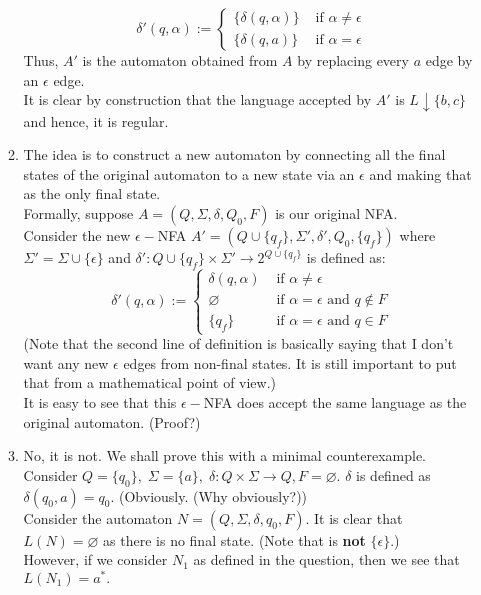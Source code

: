 \documentclass{article}
\let\emptyset\varnothing
\begin{document}
\begin{enumerate}[label = \arabic*.]
\begin{enumerate}[label = (\alph*)]
		\[\delta'(q, \alpha) := \left\{
			\begin{array}{cc}
				\{\delta(q, \alpha)\} & \text{ if }\alpha \neq \epsilon\\
				\{\delta(q, a)\} & \text{ if }\alpha = \epsilon
			\end{array}
		\right.\]
		Thus, $A'$ is the automaton obtained from $A$ by replacing every $a$ edge by an $\epsilon$ edge.\\
		It is clear by construction that the language accepted by $A'$ is $L\downarrow\{b, c\}$ and hence, it is regular.
		\item The idea is to construct a new automaton by connecting all the final states of the original automaton to a new state via an $\epsilon$ and making that as the only final state.\\
		Formally, suppose $A = (Q, \Sigma, \delta, Q_0, F)$ is our original NFA.\\
		Consider the new $\epsilon-$NFA $A' = (Q\cup\{q_f\}, \Sigma', \delta', Q_0, \{q_f\})$ where $\Sigma' = \Sigma\cup\{\epsilon\}$ and $\delta':Q\cup\{q_f\}\times\Sigma' \to 2^{Q\cup\{q_f\}}$ is defined as:
		\[\delta'(q, \alpha) := \left\{
			\begin{array}{cl}
				\delta(q, \alpha) & \text{ if }  \alpha \neq \epsilon\\
				\emptyset & \text{ if } \alpha = \epsilon\text{ and }q \notin F  \\
				\{q_f\} & \text{ if } \alpha = \epsilon \text{ and } q \in F 
			\end{array}		
		\right.\]
		(Note that the second line of definition is basically saying that I don't want any new $\epsilon$ edges from non-final states. It is still important to put that from a mathematical point of view.)\\
		It is easy to see that this $\epsilon-$NFA does accept the same language as the original automaton. \hfill (Proof?)
		\item No, it is not. We shall prove this with a minimal counterexample. Consider $Q = \{q_0\},\;\Sigma = \{a\},\;\delta:Q\times\Sigma\to Q, F = \emptyset.$ $\delta$ is defined as $\delta(q_0, a) = q_0.$ \hfill (Obviously. (Why obviously?))\\
		Consider the automaton $N = (Q, \Sigma, \delta, q_0, F).$ It is clear that $L(N) = \emptyset$ as there is no final state. (Note that is \textbf{not} $\{\epsilon\}.$)\\
		However, if we consider $N_1$ as defined in the question, then we see that $L(N_1) = a^*.$\\

\end{enumerate}
\end{enumerate}
\end{document}

